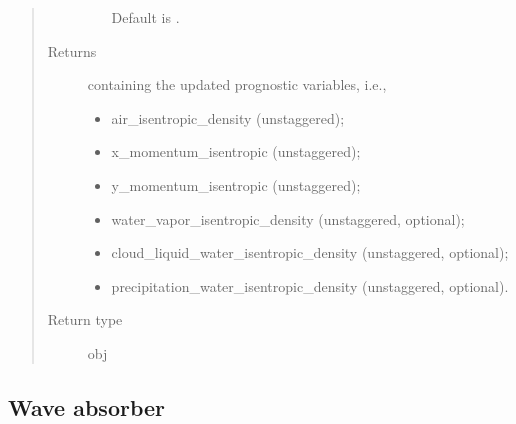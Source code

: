\documentclass[letterpaper,10pt,english]{sphinxmanual}
\begin{document}
\begin{fulllineitems}
\begin{fulllineitems}
\begin{quote}
\begin{description}
\begin{itemize}
\begin{itemize}
\end{itemize}

Default is .


\end{itemize}

\item[{Returns}] \leavevmode

{\hyperref[\detokenize{api:storages.state_isentropic.StateIsentropic}]{}} containing the updated prognostic variables, i.e.,
\begin{itemize}
\item {} 
air\_isentropic\_density (unstaggered);

\item {} 
x\_momentum\_isentropic (unstaggered);

\item {} 
y\_momentum\_isentropic (unstaggered);

\item {} 
water\_vapor\_isentropic\_density (unstaggered, optional);

\item {} 
cloud\_liquid\_water\_isentropic\_density (unstaggered, optional);

\item {} 
precipitation\_water\_isentropic\_density (unstaggered, optional).

\end{itemize}


\item[{Return type}] \leavevmode
obj

\end{description}\end{quote}

\end{fulllineitems}


\end{fulllineitems}



\subsection{Wave absorber}
\label{\detokenize{api:wave-absorber}}
\end{document}
